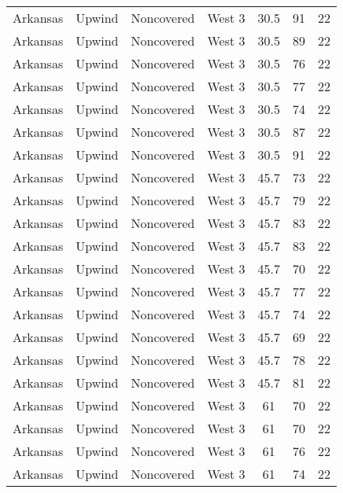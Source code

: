 \documentclass{article}
\begin{document}
\begin{longtable}[H]{ccccccc}
Arkansas & Upwind    & Noncovered & West 3        & 30.5         & 91          & 22  \\
Arkansas & Upwind    & Noncovered & West 3        & 30.5         & 89          & 22  \\
Arkansas & Upwind    & Noncovered & West 3        & 30.5         & 76          & 22  \\
Arkansas & Upwind    & Noncovered & West 3        & 30.5         & 77          & 22  \\
Arkansas & Upwind    & Noncovered & West 3        & 30.5         & 74          & 22  \\
Arkansas & Upwind    & Noncovered & West 3        & 30.5         & 87          & 22  \\
Arkansas & Upwind    & Noncovered & West 3        & 30.5         & 91          & 22  \\
Arkansas & Upwind    & Noncovered & West 3        & 45.7         & 73          & 22  \\
Arkansas & Upwind    & Noncovered & West 3        & 45.7         & 79          & 22  \\
Arkansas & Upwind    & Noncovered & West 3        & 45.7         & 83          & 22  \\
Arkansas & Upwind    & Noncovered & West 3        & 45.7         & 83          & 22  \\
Arkansas & Upwind    & Noncovered & West 3        & 45.7         & 70          & 22  \\
Arkansas & Upwind    & Noncovered & West 3        & 45.7         & 77          & 22  \\
Arkansas & Upwind    & Noncovered & West 3        & 45.7         & 74          & 22  \\
Arkansas & Upwind    & Noncovered & West 3        & 45.7         & 69          & 22  \\
Arkansas & Upwind    & Noncovered & West 3        & 45.7         & 78          & 22  \\
Arkansas & Upwind    & Noncovered & West 3        & 45.7         & 81          & 22  \\
Arkansas & Upwind    & Noncovered & West 3        & 61           & 70          & 22  \\
Arkansas & Upwind    & Noncovered & West 3        & 61           & 70          & 22  \\
Arkansas & Upwind    & Noncovered & West 3        & 61           & 76          & 22  \\
Arkansas & Upwind    & Noncovered & West 3        & 61           & 74          & 22  \\

\end{longtable}
\end{document}
